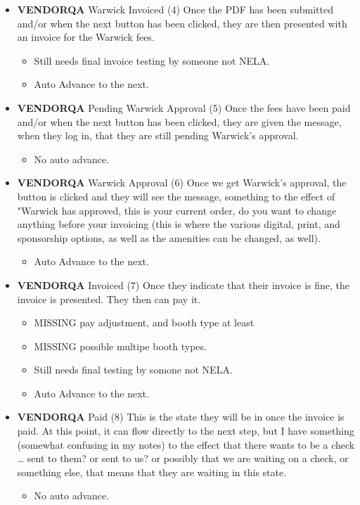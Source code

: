 \documentclass[captions=tablesignature]{scrartcl}
\begin{document}
\begin{itemize}
\item {\bfseries\sffamily VENDORQA} Warwick Invoiced (4)
\label{sec-3-1-5-3}
Once the PDF has been submitted and/or when the next button has
been clicked, they are then presented with an invoice for the
Warwick fees.
\begin{itemize}
\item Still needs final invoice testing by someone not NELA.
\item Auto Advance to the next.
\end{itemize}

\item {\bfseries\sffamily VENDORQA} Pending Warwick Approval (5)
\label{sec-3-1-5-4}
Once the fees have been paid and/or when the next button has been
clicked, they are given the message, when they log in, that they
are still pending Warwick's approval.
\begin{itemize}
\item No auto advance.
\end{itemize}

\item {\bfseries\sffamily VENDORQA} Warwick Approval (6)
\label{sec-3-1-5-5}
Once we get Warwick's approval, the button is clicked and they
will see the message, something to the effect of "Warwick has
approved, this is your current order, do you want to change
anything before your invoicing (this is where the various
digital, print, and sponsorship options, as well as the amenities
can be changed, as well).
\begin{itemize}
\item Auto Advance to the next.
\end{itemize}

\item {\bfseries\sffamily VENDORQA} Invoiced (7)
\label{sec-3-1-5-6}
Once they indicate that their invoice is fine, the invoice is
presented.  They then can pay it.
\begin{itemize}
\item MISSING pay adjustment, and booth type at least
\item MISSING possible multipe booth types.
\item Still needs final testing by somone not NELA.
\item Auto Advance to the next.
\end{itemize}

\item {\bfseries\sffamily VENDORQA} Paid (8)
\label{sec-3-1-5-7}
This is the state they will be in once the invoice is paid.  At
this point, it can flow directly to the next step, but I have
something (somewhat confusing in my notes) to the effect that
there wants to be a check \ldots{} sent to them? or sent to us? or
possibly that we are waiting on a check, or something else, that
means that they are waiting in this state.
\begin{itemize}
\item No auto advance.
\end{itemize}


\end{itemize}
\end{document}
